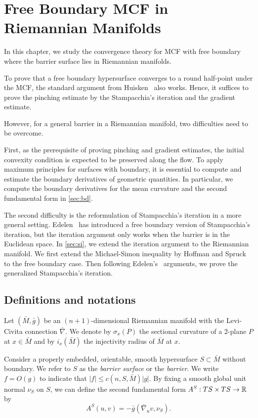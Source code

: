 

\chapter{Free Boundary MCF in Riemannian Manifolds} \label{chap:fbmcf}

In this chapter, we study the convergence theory for MCF with free boundary where the barrier surface lies in Riemannian manifolds.

To prove that a free boundary hypersurface converges to a round half-point under the MCF, the standard argument from Huisken~\cite{huisken_flow_1984} also works. Hence, it suffices to prove the pinching estimate by the Stampacchia's iteration and the gradient estimate.

However, for a general barrier in a Riemannian manifold, two difficulties need to be overcome. 

First, as the prerequisite of proving pinching and gradient estimates, the initial convexity condition is expected to be preserved along the flow. To apply maximum principles for surfaces with boundary, it is essential to compute and estimate the boundary derivatives of geometric quantities. In particular, we compute the boundary derivatives for the mean curvature and the second fundamental form in \autoref{sec:bd}.

The second difficulty is the reformulation of Stampacchia's iteration in a more general setting. Edelen~\cite{edelen_convexity_2016} has introduced a free boundary version of Stampacchia's iteration, but the iteration argument only works when the barrier is in the Euclidean space. In \autoref{sec:si}, we extend the iteration argument to the Riemannian manifold. We first extend the Michael-Simon inequality by Hoffman and Spruck~\cite{hoffman_sobolev_1974} to the free boundary case. Then following Edelen's~\cite{edelen_convexity_2016} arguments, we prove the generalized Stampacchia's iteration.

\section{Definitions and notations}

Let $(\bar{M}, \bar{g})$ be an $(n+1)$-dimensional Riemannian manifold with the Levi-Civita connection $\bar{\nabla }$. We denote by $\sigma _x(P)$ the sectional curvature of a 2-plane $P$ at $x \in \bar{M}$ and by $i_x(\bar{M})$ the injectivity radius of $\bar{M}$ at $x$. 

Consider a properly embedded, orientable, smooth hypersurface $S \subset \bar{M}$ without boundary. We refer to $S$ as the \textit{barrier surface} or the \textit{barrier}. We write $f=O(g)$ to indicate that $\left| f \right| \leq c(n,S,\bar{M})\left| g \right| $. By fixing a smooth global unit normal $\nu _S$ on $S$, we can define the second fundamental form $A^S: TS \times TS \to \mathbb{R}$ by
\[A^S(u,v)=-\bar{g}(\bar{\nabla }_u v, \nu _S).\]

